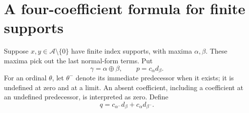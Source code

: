 \documentclass[11pt,letterpaper]{article}
\theoremstyle{definition}
\theoremstyle{remark}
\newcommand{\A}{\mathscr{A}}
\newcommand{\ns}{\mathbin{\oplus}}
\begin{document}
\section{A four-coefficient formula for finite supports}\label{sec:four}

Suppose \(x,y\in\A\setminus\{0\}\) have finite index supports, with
maxima \(\alpha,\beta\). These maxima pick out the last normal-form
terms. Put
\[
 \gamma=\alpha\ns\beta,\qquad p=c_\alpha d_\beta.
\]
For an ordinal \(\theta\), let \(\theta^-\) denote its immediate
predecessor when it exists; it is undefined at zero and at a limit.
An absent coefficient, including a coefficient at an undefined
predecessor, is interpreted as zero. Define
\begin{equation}\label{eq:near-top}
 q=c_{\alpha^-}d_\beta+c_\alpha d_{\beta^-}.
\end{equation}
\end{document}
